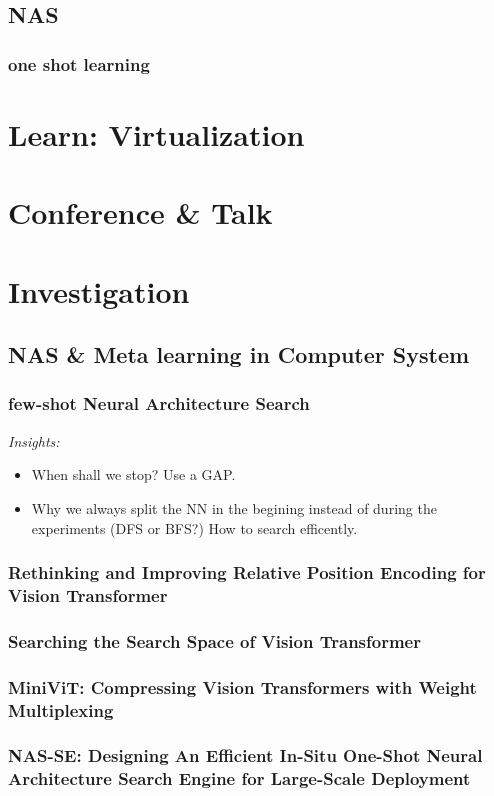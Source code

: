 \documentclass[UTF8]{article}
\begin{document}
\subsection{NAS}
\subsubsection{one shot learning}

\section{Learn: Virtualization}
\section{Conference \& Talk}

\section{Investigation}
\subsection{NAS \& Meta learning in Computer System}
    \subsubsection{few-shot Neural Architecture Search}
    \emph{Insights:}
    \begin{itemize}
        \item When shall we stop? Use a GAP.
        \item Why we always split the NN in the begining instead of during the experiments (DFS or BFS?) How to search efficently.
    \end{itemize}
    \subsubsection{Rethinking and Improving Relative Position Encoding for Vision Transformer}
    \subsubsection{Searching the Search Space of Vision Transformer}
    \subsubsection{MiniViT: Compressing Vision Transformers with Weight Multiplexing}
    \subsubsection{NAS-SE: Designing An Efficient In-Situ One-Shot Neural Architecture Search Engine for Large-Scale Deployment}
\end{document}
